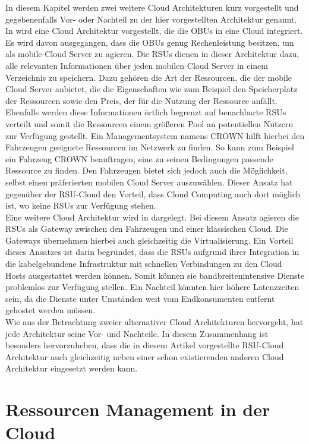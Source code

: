 \documentclass[conference]{IEEEtran}
\begin{document}
In diesem Kapitel werden zwei weitere Cloud Architekturen kurz vorgestellt und gegebenenfalls Vor- oder Nachteil zu der hier vorgestellten Architektur genannt. In \cite{IEEEhowto:star} wird eine Cloud Architektur vorgestellt, die die OBUs in eine Cloud integriert. Es wird davon ausgegangen, dass die OBUs genug Rechenleistung besitzen, um als mobile Cloud Server zu agieren. Die RSUs dienen in dieser Architektur dazu, alle relevanten Informationen über jeden mobilen Cloud Server in einem Verzeichnis zu speichern. Dazu gehören die Art der Ressourcen, die der mobile Cloud Server anbietet, die die Eigenschaften wie zum Beispiel den Speicherplatz der Ressourcen sowie den Preis, der für die Nutzung der Ressource anfällt. Ebenfalls werden diese Informationen örtlich begrenzt auf benachbarte RSUs verteilt und somit die Ressourcen einem größeren Pool an potentiellen Nutzern zur Verfügung gestellt. Ein Managementsystem namens CROWN hilft hierbei den Fahrzeugen geeignete Ressourcen im Netzwerk zu finden. So kann zum Beispiel ein Fahrzeug CROWN beauftragen, eine zu seinen Bedingungen passende Ressource zu finden. Den Fahrzeugen bietet sich jedoch auch die Möglichkeit, selbst einen präferierten mobilen Cloud Server auszuwählen. Dieser Ansatz hat gegenüber der RSU-Cloud den Vorteil, dass Cloud Computing auch dort möglich ist, wo keine RSUs zur Verfügung stehen.\\
Eine weitere Cloud Architektur wird in \cite{IEEEhowto:rethinking} dargelegt. Bei diesem Ansatz agieren die RSUs als Gateway zwischen den Fahrzeugen und einer klassischen Cloud. Die Gateways übernehmen hierbei auch gleichzeitig die Virtualisierung. Ein Vorteil dieses Ansatzes ist darin begründet, dass die RSUs aufgrund ihrer Integration in die kabelgebundene Infrastruktur mit schnellen Verbindungen zu den Cloud Hosts ausgestattet werden können. Somit können sie bandbreitenintensive Dienste problemlos zur Verfügung stellen. Ein Nachteil könnten hier höhere Latenzzeiten sein, da die Dienste unter Umständen weit vom Endkonsumenten entfernt gehostet werden müssen.\\
Wie aus der Betrachtung zweier alternativer Cloud Architekturen hervorgeht, hat jede Architektur seine Vor- und Nachteile. In diesem Zusammenhang ist besonders hervorzuheben, dass die in diesem Artikel vorgestellte RSU-Cloud Architektur auch gleichzeitig neben einer schon existierenden anderen Cloud Architektur eingesetzt werden kann. 





\section{Ressourcen Management in der Cloud}
\end{document}
